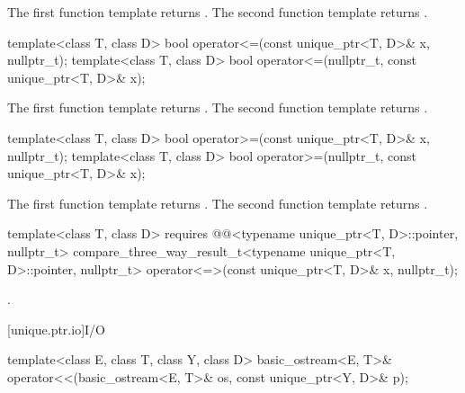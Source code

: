 \begin{itemdescr}
\pnum
\returns
The first function template returns .
The second function template returns .
\end{itemdescr}

%
\begin{itemdecl}
template<class T, class D>
  bool operator<=(const unique_ptr<T, D>& x, nullptr_t);
template<class T, class D>
  bool operator<=(nullptr_t, const unique_ptr<T, D>& x);
\end{itemdecl}

\begin{itemdescr}
\pnum
\returns
The first function template returns .
The second function template returns .
\end{itemdescr}

%
\begin{itemdecl}
template<class T, class D>
  bool operator>=(const unique_ptr<T, D>& x, nullptr_t);
template<class T, class D>
  bool operator>=(nullptr_t, const unique_ptr<T, D>& x);
\end{itemdecl}

\begin{itemdescr}
\pnum
\returns
The first function template returns .
The second function template returns .
\end{itemdescr}

%
\begin{itemdecl}
template<class T, class D>
  requires @@<typename unique_ptr<T, D>::pointer, nullptr_t>
  compare_three_way_result_t<typename unique_ptr<T, D>::pointer, nullptr_t>
    operator<=>(const unique_ptr<T, D>& x, nullptr_t);
\end{itemdecl}

\begin{itemdescr}
\pnum
\returns
{}.
\end{itemdescr}

[unique.ptr.io]{I/O}

%
\begin{itemdecl}
template<class E, class T, class Y, class D>
  basic_ostream<E, T>& operator<<(basic_ostream<E, T>& os, const unique_ptr<Y, D>& p);
\end{itemdecl}

